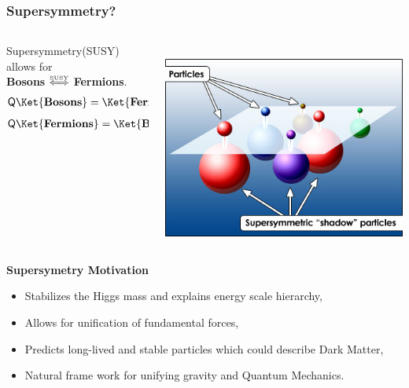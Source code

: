 \documentclass{beamer}
\begin{document}
\begin{frame}
\frametitle{\Huge{Supersymmetry?}}
\begin{minipage}[t]{\linewidth}
  \begin{columns}
    \begin{column}{0.6\textwidth}
Supersymmetry(SUSY) allows for \\
 \textbf{Bosons} $ \mathrel{\overset{\makebox[0pt]{\mbox{\normalfont\tiny SUSY}}}{\Longleftrightarrow}} $ \textbf{Fermions}.
\begin{align*}
 \mathsf{Q}\Ket{\mathbf{Bosons}} &= \Ket{\mathbf{Fermions}} 
 \end{align*}
 \begin{align*}
 \mathsf{Q}\Ket{ \mathbf{Fermions}} &= \Ket{\mathbf{Bosons}}
 \end{align*}
 
    \end{column}
    \begin{column}{0.4\textwidth}
     \mbox{
    \includegraphics[height=0.65\textwidth,width=0.30\paperwidth]{THESISPLOTS/New-Physics-PLOTS/sypersymmetry.jpg}}
    \end{column}
 \end{columns}    

\end{minipage}
\begin{minipage}[t]{\linewidth}
  \begin{varblock}[7cm]{\textbf{Supersymetry Motivation}}
  \begin{itemize}
   \item Stabilizes the Higgs mass and explains energy scale hierarchy,
   \item Allows for unification of fundamental forces,
   \item Predicts long-lived and stable particles which could describe Dark Matter,
   \item Natural frame work for unifying gravity and Quantum Mechanics.
  \end{itemize}
  \end{varblock}
\end{minipage}
\end{frame}
\end{document}
